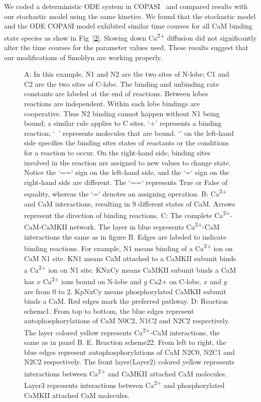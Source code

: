 \documentclass[10pt,letterpaper]{article}
\begin{document}
We coded a deterministic ODE system in COPASI~\cite{} and compared results with our stochastic model using the same kinetics. We found that the stochastic model and the ODE COPASI model exhibited similar time courses for all CaM binding state species as show in Fig~\ref{2}. Slowing down Ca\textsuperscript{2+} diffusion did not significantly alter the time courses for the parameter values used. These results suggest that our modifications of Smoldyn are working properly. 

\begin{figure}[!h]
	\caption{{\bf}
	A: In this example, N1 and N2 are the two sites of N-lobe; C1 and C2 are the two sites of C-lobe. The binding and unbinding rate constants are labeled at the end of reactions. Between lobes reactions are independent. Within each lobe bindings are cooperative. Thus N2 binding cannot happen without N1 being bound; a similar rule applies to C sites. ‘+’ represents a binding reaction; ‘~’ represents molecules that are bound. ‘{}’ on the left-hand side specifies the binding sites states of reactants or the conditions for a reaction to occur. On the right-hand side, binding sites involved in the reaction are assigned to new values to change state. Notice the ‘==‘ sign on the left-hand side, and the ‘=‘ sign on the right-hand side are different. The ‘==‘ represents True or False of equality, whereas the ‘=‘ denotes an assigning operation. B: Ca\textsuperscript{2+} and CaM interactions, resulting in 9 different states of CaM. Arrows represent the direction of binding reactions. C: The complete Ca\textsuperscript{2+}-CaM-CaMKII network. The layer in blue represents Ca\textsuperscript{2+}-CaM interactions the same as in figure B. Edges are labeled to indicate binding reactions. For example, N1 means binding of a Ca\textsuperscript{2+} ion on CaM N1 site. KN1 means CaM attached to a CaMKII subunit binds a Ca\textsuperscript{2+} ion on N1 site. KNxCy means CaMKII subunit binds a CaM has $x$ Ca\textsuperscript{2+} ions bound on N-lobe and $y$ Ca2+ on C-lobe, $x$ and $y$ are from 0 to 2. KpNxCy means phosphorylated CaMKII subunit binds a CaM. Red edges mark the preferred pathway. D: Reaction scheme1. From top to bottom, the blue edges represent autophosphorylations of CaM N0C2, N1C2 and N2C2 respectively. The layer colored yellow represents Ca\textsuperscript{2+}-CaM interactions, the same as in panel B. E. Reaction scheme22. From left to right, the blue edges represent autophosphorylations of CaM N2C0, N2C1 and N2C2 respectively. The front layer(Layer2) colored yellow represents interactions between Ca\textsuperscript{2+} and CaMKII attached CaM molecules. Layer3 represents interactions between Ca\textsuperscript{2+} and phosphorylated CaMKII attached CaM molecules.}
\label{fig1}
\end{figure}
\end{document}

